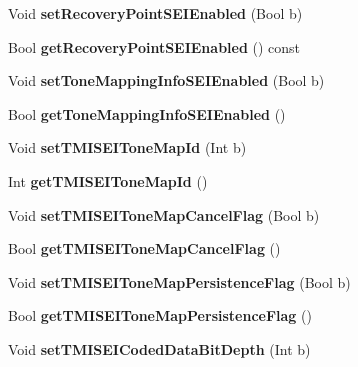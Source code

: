\begin{DoxyCompactItemize}
Void {\bfseries set\+Recovery\+Point\+S\+E\+I\+Enabled} (Bool b)
\item 
\mbox{\label{class_t_enc_cfg_ab6d4646c63a7885ba738455e662b4424}} 
Bool {\bfseries get\+Recovery\+Point\+S\+E\+I\+Enabled} () const
\item 
\mbox{\label{class_t_enc_cfg_ab999380024c2075ebc88c175477d1791}} 
Void {\bfseries set\+Tone\+Mapping\+Info\+S\+E\+I\+Enabled} (Bool b)
\item 
\mbox{\label{class_t_enc_cfg_a483e1d11eb9a49586e678201b7cd9f89}} 
Bool {\bfseries get\+Tone\+Mapping\+Info\+S\+E\+I\+Enabled} ()
\item 
\mbox{\label{class_t_enc_cfg_abd1def081819c34a7a58d9cdc5af9ef2}} 
Void {\bfseries set\+T\+M\+I\+S\+E\+I\+Tone\+Map\+Id} (Int b)
\item 
\mbox{\label{class_t_enc_cfg_a6d3b2bd05dbbdd156ec5a71b5f0ede67}} 
Int {\bfseries get\+T\+M\+I\+S\+E\+I\+Tone\+Map\+Id} ()
\item 
\mbox{\label{class_t_enc_cfg_a9ee69a3e1a3e08fa41ca2d4a5cee87dc}} 
Void {\bfseries set\+T\+M\+I\+S\+E\+I\+Tone\+Map\+Cancel\+Flag} (Bool b)
\item 
\mbox{\label{class_t_enc_cfg_a6494a7ebe9b33398e75edaf28c9ea538}} 
Bool {\bfseries get\+T\+M\+I\+S\+E\+I\+Tone\+Map\+Cancel\+Flag} ()
\item 
\mbox{\label{class_t_enc_cfg_a904bf8c23106c60658b94df6de0b67c2}} 
Void {\bfseries set\+T\+M\+I\+S\+E\+I\+Tone\+Map\+Persistence\+Flag} (Bool b)
\item 
\mbox{\label{class_t_enc_cfg_ae3cec67fbda9e587dc34a6a729922edf}} 
Bool {\bfseries get\+T\+M\+I\+S\+E\+I\+Tone\+Map\+Persistence\+Flag} ()
\item 
\mbox{\label{class_t_enc_cfg_a2e8b795957aa8bcacc4acd85d11ea5cf}} 
Void {\bfseries set\+T\+M\+I\+S\+E\+I\+Coded\+Data\+Bit\+Depth} (Int b)
\item 
\mbox{\label{class_t_enc_cfg_ab2fdb244d9a45e79cf1981d29999bb2b}} 

\end{DoxyCompactItemize}
